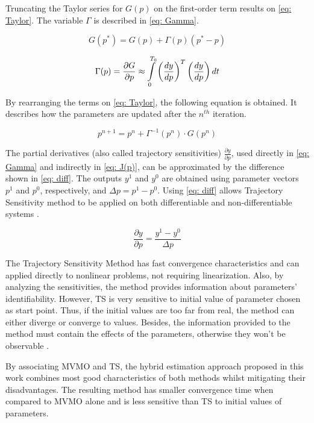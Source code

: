 Truncating the Taylor series for $G(p)$ on the first-order term results on \eqref{eq: Taylor}. The variable $\Gamma$ is described in \eqref{eq: Gamma}.

\begin{equation}
	G(p^{*}) = G(p) + \Gamma (p)(p^{*} - p)
	\label{eq: Taylor}
\end{equation}

\begin{equation}
	\Gamma (p) = \frac{\partial G}{\partial p} \approx \int\displaylimits_{0}^{T_{0}} \left(\frac{dy}{dp}\right)^{T} \left(\frac{dy}{dp}\right) dt
	\label{eq: Gamma}
\end{equation}

By rearranging the terms on \eqref{eq: Taylor}, the following equation is obtained. It describes how the parameters are updated after the $n^{th}$ iteration.

\begin{equation}
	p^{n+1} = p^{n} + \Gamma^{-1}(p^{n})\cdot G(p^{n})
\end{equation}

The partial derivatives (also called trajectory sensitivities) $\frac{\partial y}{\partial p}$, used directly in \eqref{eq: Gamma} and indirectly in \eqref{eq: J(p)}, can be approximated by the difference shown in \eqref{eq: diff}. The outputs $y^{1}$ and $y^{0}$ are obtained using parameter vectors $p^{1}$ and $p^{0}$, respectively, and $\Delta p = p^{1} - p^{0}$. Using \eqref{eq: diff} allows Trajectory Sensitivity method to be applied on both differentiable and non-differentiable systems \cite{Benchluch1993}.
 
\begin{equation}
	\frac{\partial y}{\partial p} = \frac{y^{1} - y^{0}}{\Delta p}
	\label{eq: diff}
\end{equation}

The Trajectory Sensitivity Method has fast convergence characteristics and can applied directly to nonlinear problems, not requiring linearization. Also, by analyzing the sensitivities, the method provides information about parameters' identifiability. However, TS is very sensitive to initial value of parameter chosen as start point. Thus, if the initial values are too far from real, the method can either diverge or converge to  values. Besides, the information provided to the method must contain the effects of the parameters, otherwise they won't be observable \cite{Benchluch1993}.

By associating MVMO and TS, the hybrid estimation approach proposed in this work combines most good characteristics of both methods whilst mitigating their disadvantages. The resulting method has smaller convergence time when compared to MVMO alone and is less sensitive than TS to initial values of parameters.
